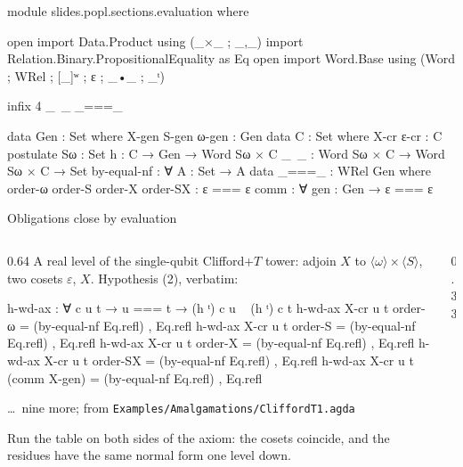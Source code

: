 \begin{code}[hide]
module slides.popl.sections.evaluation where

open import Data.Product using (_×_ ; _,_)
import Relation.Binary.PropositionalEquality as Eq
open import Word.Base using (Word ; WRel ; [_]ʷ ; ε ; _•_ ; _ᵗ)

infix 4 _~_ _===_

data Gen : Set where
  X-gen S-gen ω-gen : Gen
data C : Set where
  X-cr ε-cr : C
postulate
  Sω : Set
  h  : C → Gen → Word Sω × C
  _~_ : Word Sω × C → Word Sω × C → Set
  by-equal-nf : ∀ {A : Set} → A
data _===_ : WRel Gen where
  order-ω order-S order-X order-SX : ε === ε
  comm : ∀ {gen : Gen} → ε === ε
\end{code}

\begin{frame}{Obligations close by evaluation}
\begin{columns}[c]
\begin{column}{0.64\textwidth}
\small A real level of the single-qubit Clifford+$T$ tower: adjoin $X$ to
$\langle\omega\rangle\times\langle S\rangle$, two cosets $\varepsilon$, $X$.
Hypothesis (2), verbatim:
\renewcommand{\AgdaCodeStyle}{\scriptsize}
\begin{code}
h-wd-ax : ∀ c {u t} → u === t → (h ᵗ) c u ~ (h ᵗ) c t
h-wd-ax X-cr {u} {t} order-ω = (by-equal-nf Eq.refl) , Eq.refl
h-wd-ax X-cr {u} {t} order-S = (by-equal-nf Eq.refl) , Eq.refl
h-wd-ax X-cr {u} {t} order-X = (by-equal-nf Eq.refl) , Eq.refl
h-wd-ax X-cr {u} {t} order-SX = (by-equal-nf Eq.refl) , Eq.refl
h-wd-ax X-cr {u} {t} (comm {X-gen}) = (by-equal-nf Eq.refl) , Eq.refl
\end{code}
{\scriptsize \ldots\ nine more; from \texttt{Examples/Amalgamations/CliffordT1.agda}}
\vspace{4pt}

Run the table on both sides of the axiom: the cosets coincide, and the
residues have the \alert{same normal form one level down}.
\end{column}
\begin{column}{0.33\textwidth}
\centering
{}


\end{column}
\end{columns}
\end{frame}
